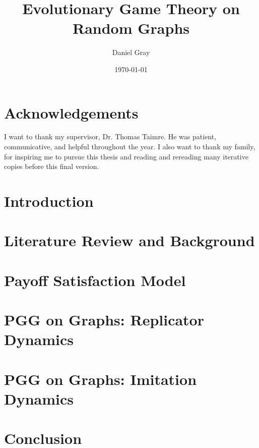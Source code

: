 \documentclass[12pt,twoside]{report}
\title{Evolutionary Game Theory on Random Graphs}
\author{Daniel Gray}
\date{\today}
\begin{document}






\chapter*{Acknowledgements}
I want to thank my supervisor, Dr. Thomas Taimre. He was patient, communicative, and helpful throughout the year. I also want to thank my family, for inspiring me to pursue this thesis and reading and rereading many iterative copies before this final version. 

\tableofcontents



\chapter{Introduction} \label{Chapter:Intro}

\chapter{Literature Review and Background} \label{Chapter:Lit}

\chapter{Payoff Satisfaction Model} \label{TA}


\chapter{PGG on Graphs: Replicator Dynamics} 
\label{Chapter:Rep}

\chapter{PGG on Graphs: Imitation Dynamics} 
\label{Chapter:ID}



\chapter{Conclusion} \label{Conclusion}


%

\printbibliography
\end{document}
